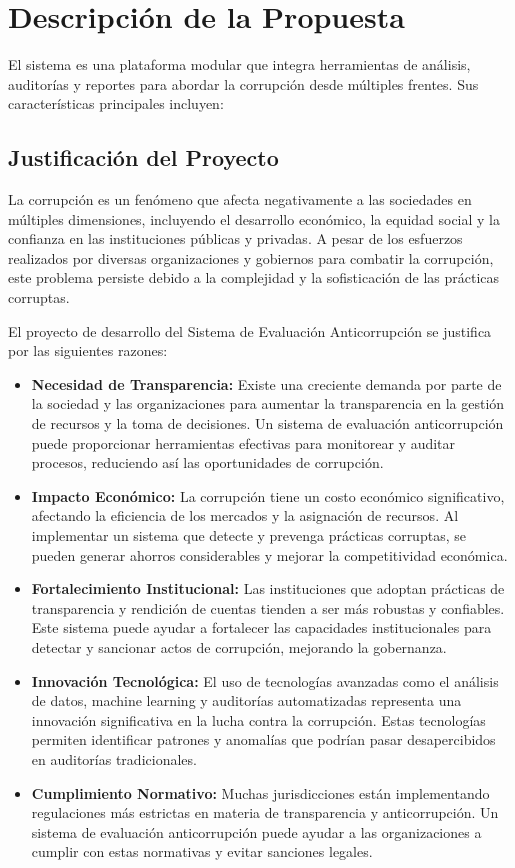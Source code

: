 \documentclass[a4paper,12pt]{article}
\begin{document}
\section{Descripción de la Propuesta}
El sistema es una plataforma modular que integra herramientas de análisis, auditorías y reportes para abordar la corrupción desde múltiples frentes. Sus características principales incluyen:

\subsection{Justificación del Proyecto}
La corrupción es un fenómeno que afecta negativamente a las sociedades en múltiples dimensiones, incluyendo el desarrollo económico, la equidad social y la confianza en las instituciones públicas y privadas. A pesar de los esfuerzos realizados por diversas organizaciones y gobiernos para combatir la corrupción, este problema persiste debido a la complejidad y la sofisticación de las prácticas corruptas.

El proyecto de desarrollo del Sistema de Evaluación Anticorrupción se justifica por las siguientes razones:

\begin{itemize}
    \item \textbf{Necesidad de Transparencia:} Existe una creciente demanda por parte de la sociedad y las organizaciones para aumentar la transparencia en la gestión de recursos y la toma de decisiones. Un sistema de evaluación anticorrupción puede proporcionar herramientas efectivas para monitorear y auditar procesos, reduciendo así las oportunidades de corrupción.
    
    \item \textbf{Impacto Económico:} La corrupción tiene un costo económico significativo, afectando la eficiencia de los mercados y la asignación de recursos. Al implementar un sistema que detecte y prevenga prácticas corruptas, se pueden generar ahorros considerables y mejorar la competitividad económica.
    
    \item \textbf{Fortalecimiento Institucional:} Las instituciones que adoptan prácticas de transparencia y rendición de cuentas tienden a ser más robustas y confiables. Este sistema puede ayudar a fortalecer las capacidades institucionales para detectar y sancionar actos de corrupción, mejorando la gobernanza.
    
    \item \textbf{Innovación Tecnológica:} El uso de tecnologías avanzadas como el análisis de datos, machine learning y auditorías automatizadas representa una innovación significativa en la lucha contra la corrupción. Estas tecnologías permiten identificar patrones y anomalías que podrían pasar desapercibidos en auditorías tradicionales.
    
    \item \textbf{Cumplimiento Normativo:} Muchas jurisdicciones están implementando regulaciones más estrictas en materia de transparencia y anticorrupción. Un sistema de evaluación anticorrupción puede ayudar a las organizaciones a cumplir con estas normativas y evitar sanciones legales.
\end{itemize}
\end{document}

